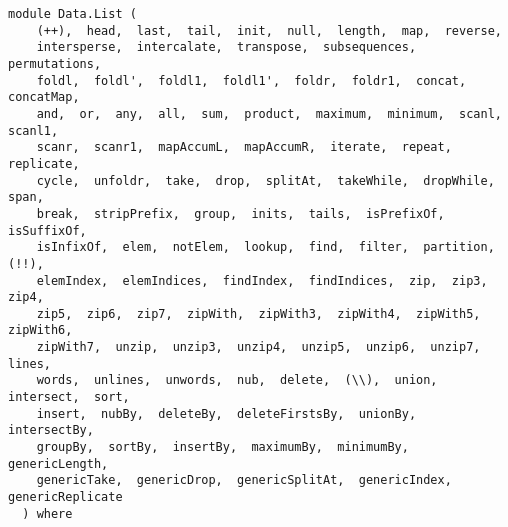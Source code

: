 \label{module:Data.List}
\haddockbeginheader
{\haddockverb\begin{verbatim}
module Data.List (
    (++),  head,  last,  tail,  init,  null,  length,  map,  reverse, 
    intersperse,  intercalate,  transpose,  subsequences,  permutations, 
    foldl,  foldl',  foldl1,  foldl1',  foldr,  foldr1,  concat,  concatMap, 
    and,  or,  any,  all,  sum,  product,  maximum,  minimum,  scanl,  scanl1, 
    scanr,  scanr1,  mapAccumL,  mapAccumR,  iterate,  repeat,  replicate, 
    cycle,  unfoldr,  take,  drop,  splitAt,  takeWhile,  dropWhile,  span, 
    break,  stripPrefix,  group,  inits,  tails,  isPrefixOf,  isSuffixOf, 
    isInfixOf,  elem,  notElem,  lookup,  find,  filter,  partition,  (!!), 
    elemIndex,  elemIndices,  findIndex,  findIndices,  zip,  zip3,  zip4, 
    zip5,  zip6,  zip7,  zipWith,  zipWith3,  zipWith4,  zipWith5,  zipWith6, 
    zipWith7,  unzip,  unzip3,  unzip4,  unzip5,  unzip6,  unzip7,  lines, 
    words,  unlines,  unwords,  nub,  delete,  (\\),  union,  intersect,  sort, 
    insert,  nubBy,  deleteBy,  deleteFirstsBy,  unionBy,  intersectBy, 
    groupBy,  sortBy,  insertBy,  maximumBy,  minimumBy,  genericLength, 
    genericTake,  genericDrop,  genericSplitAt,  genericIndex,  genericReplicate
  ) where\end{verbatim}}
\haddockendheader

